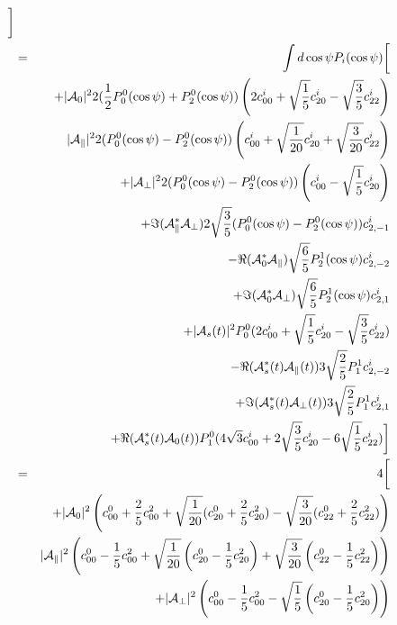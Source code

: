 \documentclass[a4paper,9pt,twosided]{article}
\begin{document}
\begin{eqnarray}
          \biggr] \\
      &=& \int d\cos\psi   P_i(\cos\psi) \biggl[  \\
          &&                  +|{\cal A}_0|^2 2 (\frac{1}{2}P_0^0(\cos\psi)+P_2^0(\cos\psi) ) \left( 2 c^i_{00}+\sqrt{\frac{1}{ 5}}c^i_{20}-\sqrt{\frac{3}{ 5}}c^i_{22} \right) \\
          &&                   |{\cal A}_\parallel|^2 2( P_0^0(\cos\psi) - P_2^0(\cos\psi)  )           \left( c^i_{00}  +\sqrt{\frac{1}{20}}c^i_{20}+\sqrt{\frac{3}{20}}c^i_{22}  \right)  \\
          &&                  +|{\cal A}_\perp|^2 2 ( P_0^0(\cos\psi) - P_2^0(\cos\psi)  )              \left( c^i_{00}  -\sqrt{\frac{1}{ 5}}c^i_{20}\right)\\
          &&                  +\Im({\cal A}_\parallel^*{\cal A}_\perp)2\sqrt{\frac{3}{5}} ( P_0^0(\cos\psi) - P_2^0(\cos\psi)  ) c^i_{2,-1}  \\
          &&                  -\Re({\cal A}_0^*{\cal A}_\parallel  )  \sqrt{\frac{6}{5}}P_2^1(\cos\psi) c^i_{2,-2}\\ 
          &&                  +\Im({\cal A}_0^* {\cal A}_\perp )      \sqrt{\frac{6}{5}}P_2^1(\cos\psi)c^i_{2,1} \\
          &&                  +|{\cal A}_{s}(t)|^2  P_0^0 (2c^i_{00} + \sqrt{\frac{1}{5}}c^i_{20} -\sqrt{\frac{3}{5}} c^i_{22}) \\
          &&                  -\Re({\cal A}_{s}^*(t){\cal A}_\parallel(t)) 3\sqrt{\frac{2}{5}} P_1^1 c^i_{2,-2}\\
          &&                  +\Im({\cal A}_{s}^*(t){\cal A}_\perp(t)) 3\sqrt{\frac{2}{5}} P_1^1 c^i_{2,1}\\
          &&                  +\Re({\cal A}_{s}^*(t){\cal A}_0(t)) P_1^0( 4\sqrt{3}  c^i_{00} + 2 \sqrt{\frac{3}{5}} c^i_{20} - 6 \sqrt{\frac{1}{5}}c^i_{22})
      \biggr] \\
      &=& 4\biggl[ \\
         &&                   +|{\cal A}_0|^2   \left( c^0_{00}+\frac{2}{5}c^2_{00}+\sqrt{\frac{1}{20}}(c^0_{20}+\frac{2}{5}c^2_{20})-\sqrt{\frac{3}{20}}(c^0_{22}+\frac{2}{5}c^2_{22}) \right) \\
         &&                    |{\cal A}_\parallel|^2 \left( c^0_{00}-\frac{1}{5}c^2_{00}+\sqrt{\frac{1}{20}}\left(c^0_{20}-\frac{1}{5}c^2_{20}\right)+\sqrt{\frac{3}{20}}\left(c^0_{22}-\frac{1}{5}c^2_{22}\right)  \right)  \\
         &&                   +|{\cal A}_\perp|^2    \left( c^0_{00}-\frac{1}{5}c^2_{00} - \sqrt{\frac{1}{5}}\left(c^0_{20}-\frac{1}{5}c^2_{20}\right)\right)\\

\end{eqnarray}
\end{document}
